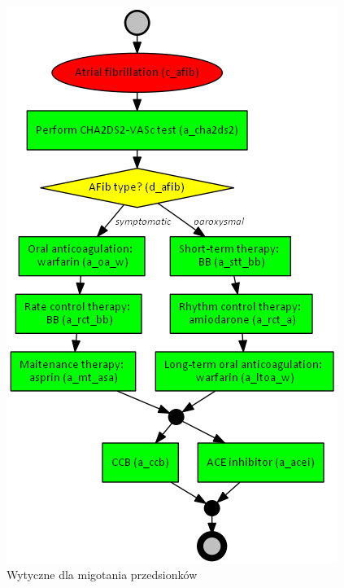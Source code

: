 \begin{figure}[H]
\centering
\includegraphics[scale=0.5]{img/afib-ver-4_przyklad.png}
\caption{Wytyczne dla migotania przedsionków}
\label{fig:afib_przyklad}
\end{figure}
